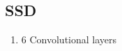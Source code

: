 \documentclass{article}
\begin{document}
\subsection{SSD}
\begin{enumerate}
	\item 6 Convolutional layers
\end{enumerate}





\end{document}
